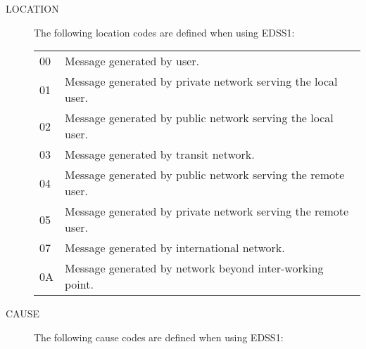 \begin{description}
\item [LOCATION] 
 
  The following location codes are defined when using EDSS1:

  \begin{small}
  \begin{longtable}{lp{12cm}}

  00 &   Message generated by user. \\
  01 &   Message generated by private network serving the local user. \\
  02 &   Message generated by public network serving the local user. \\
  03 &   Message generated by transit network. \\
  04 &   Message generated by public network serving the remote user. \\
  05 &   Message generated by private network serving the remote
  user. \\
  07 &   Message generated by international network. \\
  0A &   Message generated by network beyond inter-working point. \\
  \end{longtable}
  \end{small}

\item  [CAUSE]

  The following cause codes are defined when using EDSS1:

  \begin{small}
  \begin{longtable}{lp{12cm}}


\end{longtable}
\end{small}
\end{description}
